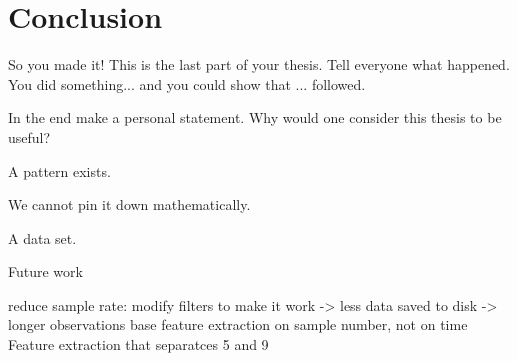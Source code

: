 \chapter{Conclusion}\label{chapter:conclusion} \label{ch:conclusions}
So you made it!
This is the last part of your thesis.
Tell everyone what happened.
You did something... and you could show that ... followed.

In the end make a personal statement.
Why would one consider this thesis to be useful?


A pattern exists.

We cannot pin it down mathematically.

A data set.



Future work

reduce sample rate: modify filters to make it work -> less data saved to disk -> longer observations
base feature extraction on sample number, not on time
Feature extraction that separatces 5 and 9
